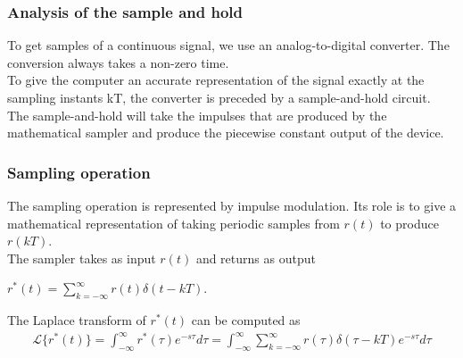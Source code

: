 \begin{frame}
	\frametitle{Analysis of the sample and hold}
	To get samples of a continuous signal, we use an analog-to-digital converter. The conversion always takes a non-zero time.\\
	\vspace{1em}
	To give the computer an accurate representation of the signal exactly at the sampling instants kT, the converter is preceded by a sample-and-hold circuit.\\
	\vspace{1em}
	The sample-and-hold will take the impulses that are produced by the mathematical sampler and produce the piecewise constant output of the device.
\end{frame}

\begin{frame}
	\frametitle{Sampling operation}
	\begin{block}{}
	The sampling operation is represented by impulse modulation. Its role is to give a mathematical representation of taking periodic samples from $r(t)$ to produce $r(kT)$. \\
	\vspace{1em}
	The sampler takes as input $r(t)$ and returns as output
	\begin{center}
	$r^*(t)=\sum_{k=-\infty}^{\infty} r(t)\delta(t-kT)$.
	\end{center}
	\vspace{1em}
	The Laplace transform of $r^*(t)$ can be computed as\\
	\vspace{-1.5em}
	\begin{align*} 
	\mathcal{L}\{r^*(t)\} = \int_{-\infty}^{\infty} r^*(\tau)e^{-s\tau} d\tau = \int_{-\infty}^{\infty} \sum_{k=-\infty}^{\infty} r(\tau)\delta(\tau-kT)e^{-s\tau}d\tau 
	\end{align*}\\
	\end{block}
\end{frame}

